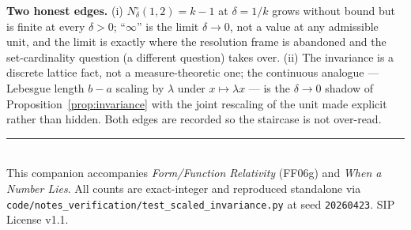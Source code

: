 \documentclass[11pt]{article}
\theoremstyle{definition}
\theoremstyle{plain}
\begin{document}
\textbf{Two honest edges.} (i) $N_\delta^{\circ}(1,2)=k-1$ at $\delta=1/k$ grows without bound but is
finite at every $\delta>0$; ``$\infty$'' is the limit $\delta\to0$, not a value at any admissible unit,
and the limit is exactly where the resolution frame is abandoned and the set-cardinality question (a
different question) takes over. (ii) The invariance is a discrete lattice fact, not a measure-theoretic
one; the continuous analogue --- Lebesgue length $b-a$ scaling by $\lambda$ under $x\mapsto\lambda x$ ---
is the $\delta\to0$ shadow of Proposition~\ref{prop:invariance} with the joint rescaling of the unit
made explicit rather than hidden. Both edges are recorded so the staircase is not over-read.

\vspace{1em}
\noindent\rule{\linewidth}{0.4pt}\\
\small This companion accompanies \textit{Form/Function Relativity} (FF06g) and \textit{When a Number
Lies}. All counts are exact-integer and reproduced standalone via
\texttt{code/notes\_verification/test\_scaled\_invariance.py} at seed \texttt{20260423}. SIP License v1.1.
\end{document}

